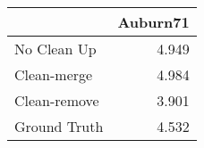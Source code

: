 \begin{tabular}{lr}
\toprule
{} & Auburn71 \\
\midrule
No Clean Up  &    4.949 \\
Clean-merge  &    4.984 \\
Clean-remove &    3.901 \\
Ground Truth &    4.532 \\
\bottomrule
\end{tabular}
